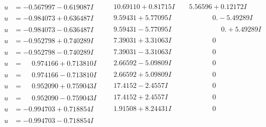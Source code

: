 \documentclass[1p]{elsarticle_modified}
\theoremstyle{definition}
\begin{document}
$$\begin{array}{c|c|c}
 \hline 
\begin{aligned}
u &= -0.567997 - 0.619087 I\end{aligned}
 & \phantom{-}10.69110 + 0.81715 I & \phantom{-}5.56596 + 0.12172 I \\ \hline\begin{aligned}
u &= -0.984073 + 0.636487 I\end{aligned}
 & \phantom{-}9.59431 + 5.77095 I & \phantom{-0.000000 } 0. - 5.49289 I \\ \hline\begin{aligned}
u &= -0.984073 - 0.636487 I\end{aligned}
 & \phantom{-}9.59431 - 5.77095 I & \phantom{-0.000000 -}0. + 5.49289 I \\ \hline\begin{aligned}
u &= -0.952798 + 0.740289 I\end{aligned}
 & \phantom{-}7.39031 + 3.31063 I & \phantom{-0.000000 } 0 \\ \hline\begin{aligned}
u &= -0.952798 - 0.740289 I\end{aligned}
 & \phantom{-}7.39031 - 3.31063 I & \phantom{-0.000000 } 0 \\ \hline\begin{aligned}
u &= \phantom{-}0.974166 + 0.713810 I\end{aligned}
 & \phantom{-}2.66592 - 5.09809 I & \phantom{-0.000000 } 0 \\ \hline\begin{aligned}
u &= \phantom{-}0.974166 - 0.713810 I\end{aligned}
 & \phantom{-}2.66592 + 5.09809 I & \phantom{-0.000000 } 0 \\ \hline\begin{aligned}
u &= \phantom{-}0.952090 + 0.759043 I\end{aligned}
 & \phantom{-}17.4152 - 2.4557 I & \phantom{-0.000000 } 0 \\ \hline\begin{aligned}
u &= \phantom{-}0.952090 - 0.759043 I\end{aligned}
 & \phantom{-}17.4152 + 2.4557 I & \phantom{-0.000000 } 0 \\ \hline\begin{aligned}
u &= -0.994703 + 0.718854 I\end{aligned}
 & \phantom{-}1.91508 + 8.24431 I & \phantom{-0.000000 } 0 \\ \hline\begin{aligned}
u &= -0.994703 - 0.718854 I\end{aligned}

\end{array}$$
\end{document}
